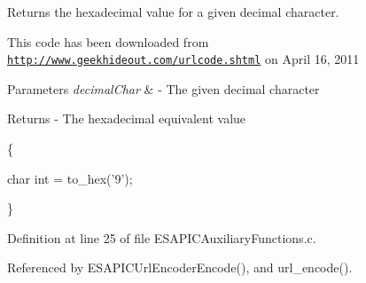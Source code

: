 Returns the hexadecimal value for a given decimal character. 

This code has been downloaded from \href{http://www.geekhideout.com/urlcode.shtml}{\tt http://www.geekhideout.com/urlcode.shtml} on April 16, 2011


\begin{DoxyParams}{Parameters}
{\em decimalChar} & -\/ The given decimal character\\
\hline
\end{DoxyParams}
\begin{DoxyReturn}{Returns}
-\/ The hexadecimal equivalent value
\end{DoxyReturn}
\{ 
\begin{DoxyCode}
        char int = to_hex('9');
\end{DoxyCode}
 \} 

Definition at line 25 of file ESAPICAuxiliaryFunctions.c.



Referenced by ESAPICUrlEncoderEncode(), and url\_\-encode().

